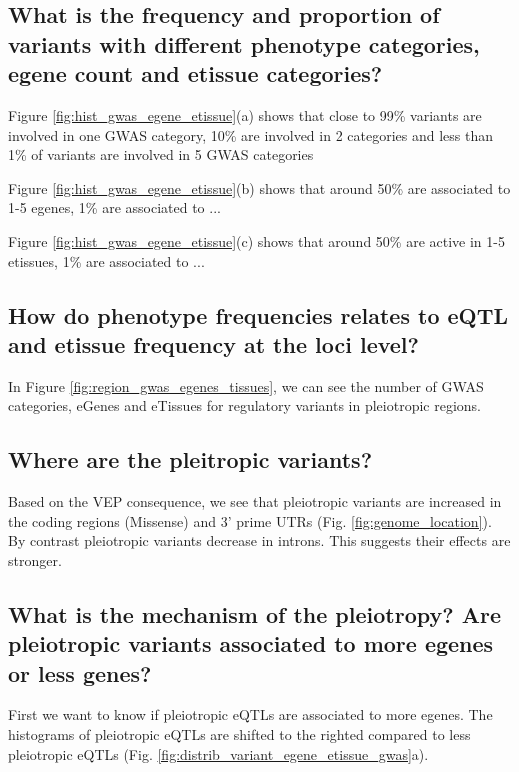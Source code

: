 \subsection*{What is the frequency and proportion of variants with different phenotype categories, egene count and etissue categories?}

Figure \ref{fig:hist_gwas_egene_etissue}(a) shows that close to 99\% variants are involved in one GWAS category, 10\% are involved in 2 categories and less than 1\% of variants are involved in 5 GWAS categories

Figure \ref{fig:hist_gwas_egene_etissue}(b) shows that around 50\% are associated to 1-5 egenes, 1\% are associated to ...

Figure \ref{fig:hist_gwas_egene_etissue}(c) shows that around 50\% are active in 1-5 etissues, 1\% are associated to ...

\subsection*{How do phenotype frequencies relates to eQTL and etissue frequency at the loci level?}

In Figure \ref{fig:region_gwas_egenes_tissues}, we can see the number of GWAS categories, eGenes and eTissues for regulatory variants in pleiotropic regions.

\subsection*{Where are the pleitropic variants?}

Based on the VEP consequence, we see that pleiotropic variants are increased in the coding regions (Missense) and 3' prime UTRs (Fig. \ref{fig:genome_location}).
By contrast pleiotropic variants decrease in introns.
This suggests their effects are stronger.

\subsection*{What is the mechanism of the pleiotropy? Are pleiotropic variants associated to more egenes or less genes?}

First we want to know if pleiotropic eQTLs are associated to more egenes.
The histograms of pleiotropic eQTLs are shifted to the righted compared to less pleiotropic eQTLs (Fig. \ref{fig:distrib_variant_egene_etissue_gwas}a).

